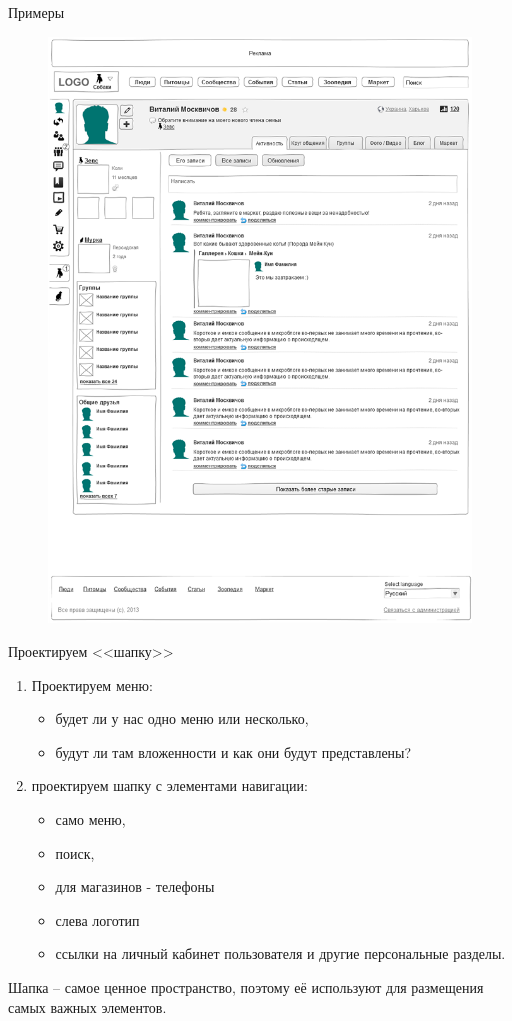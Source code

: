 \documentclass{beamer}
\begin{document}
\begin{frame}[t]{Примеры}
\begin{figure}[h]
\centering
\includegraphics[scale=0.4]{images/SLJ_maket1-sm.png}
\end{figure}
\end{frame}

\begin{frame}[t]{Проектируем <<шапку>>}
\begin{enumerate}
\item Проектируем меню: 
	\begin{itemize}
		\item будет ли у нас одно меню или несколько, 
		\item будут ли там вложенности и как они будут представлены? 	
	\end{itemize}
\item проектируем шапку с элементами навигации:
	\begin{itemize}
		\item само меню, 
		\item поиск, 
		\item для магазинов - телефоны
		\item слева логотип
		\item ссылки на личный кабинет пользователя и другие персональные разделы. 
	\end{itemize}
\end{enumerate}
Шапка – самое ценное пространство, поэтому её используют для размещения самых важных элементов.
\end{frame}
\end{document}
